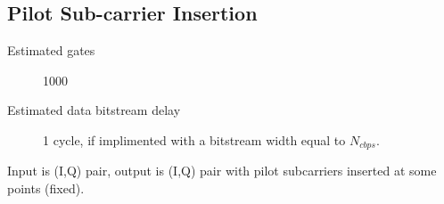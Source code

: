 

\subsection{Pilot Sub-carrier Insertion}
\label{sec:pilot}
\begin{description}
	\item[Estimated gates] 1000
	\item[Estimated data bitstream delay] 1 cycle, if implimented with a bitstream width equal to $N_{cbps}$.
\end{description}

Input is (I,Q) pair, output is (I,Q) pair with pilot subcarriers
inserted at some points (fixed).


